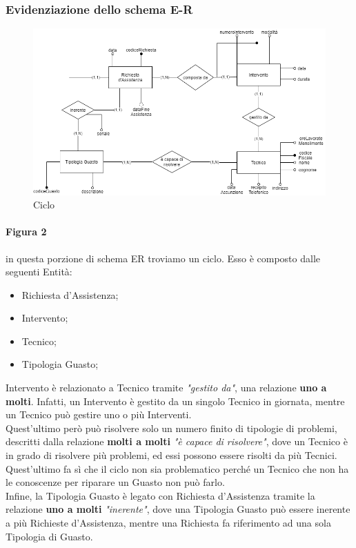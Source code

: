 \documentclass[legalpaper]{article}
\begin{document}
\subsubsection{Evidenziazione dello schema E-R}



\begin{figure}[!ht]
	\centering
	\begin{minipage}[b]{0.8\textwidth}
		\includegraphics[width=\linewidth]{image/ciclo.png}
			\caption{Ciclo}
		\label{fig:ciclo}

	\end{minipage}
\hfill

\end{figure}

\paragraph{Figura 2}
in questa porzione di schema ER troviamo un ciclo. Esso è composto dalle seguenti Entità: 
		\begin{itemize}
			\item Richiesta d'Assistenza;
			\item Intervento;
			\item Tecnico;
			\item Tipologia Guasto;
		\end{itemize}
		
		Intervento è relazionato a Tecnico tramite \textit{"gestito da"}, una relazione \textbf{uno a molti}. Infatti, un Intervento è gestito da un singolo Tecnico in giornata, mentre un Tecnico può gestire uno o più Interventi.\\	
		Quest'ultimo però può risolvere solo un numero finito di tipologie di problemi, descritti dalla relazione \textbf{molti a molti} \textit{"è capace di risolvere"}, dove un Tecnico è in grado di risolvere più problemi, ed essi possono essere risolti da più Tecnici.\\
		Quest'ultimo fa sì che il ciclo non sia problematico perché un Tecnico che non ha le conoscenze per riparare un Guasto non può farlo.\\
		Infine, la Tipologia Guasto è legato con Richiesta d'Assistenza tramite la relazione \textbf{uno a molti} \textit{"inerente"}, dove una Tipologia Guasto può essere inerente a più Richieste d'Assistenza, mentre una Richiesta fa riferimento ad una sola Tipologia di Guasto.
\end{document}
